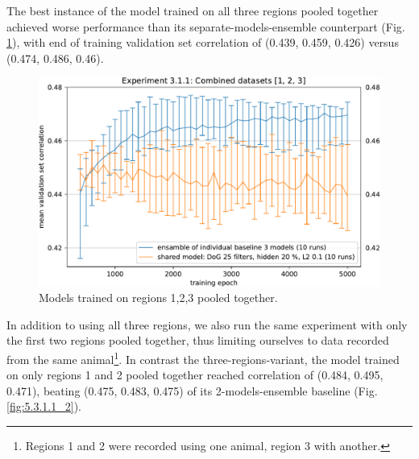 The best instance of the model trained on all three regions pooled together achieved worse performance than its separate-models-ensemble counterpart (Fig. \ref{fig:5.3.1.1_1}), with end of training validation set correlation of (0.439, 0.459, 0.426) versus (0.474, 0.486, 0.46). 

\begin{figure}[H]
    \centering
    \includegraphics[width=1\textwidth]{../figures/05_3_1_1_1}
    \caption[Experiment 3.1.1]{Models trained on {regions 1,2,3} pooled together\protect\footnotemark.}
    \label{fig:5.3.1.1_1}
\end{figure}

In addition to using all three regions, we also run the same experiment with only the first two regions pooled together, thus limiting ourselves to data recorded from the same animal\footnote{{Regions 1} and {2} were recorded using one animal, {region 3} with another.}. In contrast the three-regions-variant, the model trained on only {regions 1} and {2} pooled together reached correlation of (0.484, 0.495, 0.471), beating (0.475, 0.483, 0.475) of its 2-models-ensemble baseline (Fig. \ref{fig:5.3.1.1_2}).

